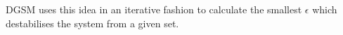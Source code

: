 DGSM uses this idea in an iterative fashion to calculate the smallest $\epsilon$ which destabilises the system from a given set.


